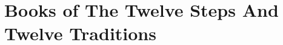 \documentclass[twopage,twocolumn,10pt]{memoir}
\begin{document}
    


    


    
    
    
    

    
    
    
    

    
    
    

    
    
    

    



    \part*{Books of The Twelve Steps And Twelve Traditions}

    
    
    
\end{document}
